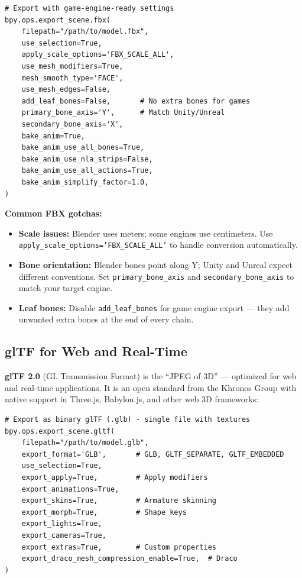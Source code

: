 \begin{lstlisting}
# Export with game-engine-ready settings
bpy.ops.export_scene.fbx(
    filepath="/path/to/model.fbx",
    use_selection=True,
    apply_scale_options='FBX_SCALE_ALL',
    use_mesh_modifiers=True,
    mesh_smooth_type='FACE',
    use_mesh_edges=False,
    add_leaf_bones=False,       # No extra bones for games
    primary_bone_axis='Y',      # Match Unity/Unreal
    secondary_bone_axis='X',
    bake_anim=True,
    bake_anim_use_all_bones=True,
    bake_anim_use_nla_strips=False,
    bake_anim_use_all_actions=True,
    bake_anim_simplify_factor=1.0,
)
\end{lstlisting}

\begin{warningbox}
\textbf{Common FBX gotchas:}
\begin{itemize}[leftmargin=1em]
  \item \textbf{Scale issues:} Blender uses meters; some engines use centimeters. Use \texttt{apply\_scale\_options='FBX\_SCALE\_ALL'} to handle conversion automatically.
  \item \textbf{Bone orientation:} Blender bones point along Y; Unity and Unreal expect different conventions. Set \texttt{primary\_bone\_axis} and \texttt{secondary\_bone\_axis} to match your target engine.
  \item \textbf{Leaf bones:} Disable \texttt{add\_leaf\_bones} for game engine export --- they add unwanted extra bones at the end of every chain.
\end{itemize}
\end{warningbox}

\subsection{glTF for Web and Real-Time}

\textbf{glTF 2.0} (GL Transmission Format) is the ``JPEG of 3D'' --- optimized for web and real-time applications. It is an open standard from the Khronos Group with native support in Three.js, Babylon.js, and other web 3D frameworks:

\begin{lstlisting}
# Export as binary glTF (.glb) - single file with textures
bpy.ops.export_scene.gltf(
    filepath="/path/to/model.glb",
    export_format='GLB',       # GLB, GLTF_SEPARATE, GLTF_EMBEDDED
    use_selection=True,
    export_apply=True,         # Apply modifiers
    export_animations=True,
    export_skins=True,         # Armature skinning
    export_morph=True,         # Shape keys
    export_lights=True,
    export_cameras=True,
    export_extras=True,        # Custom properties
    export_draco_mesh_compression_enable=True,  # Draco
)
\end{lstlisting}

